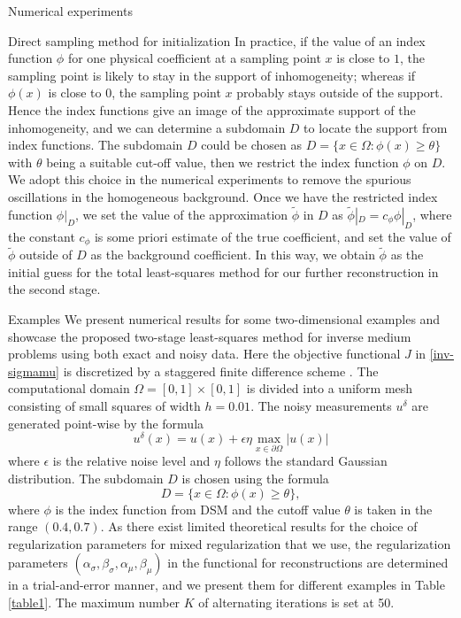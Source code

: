 \documentclass[11pt]{article}%
\renewcommand{\_}{{\fontfamily{ptm}\selectfont\textunderscore}}
\theoremstyle{plain}
\numberwithin{equation}{section}
\begin{document}
\begin{section}{Numerical experiments}
\begin{subsection}{Direct sampling method for initialization}
In practice, if the value of an index function $\phi$ for one physical coefficient at a sampling point $x$ is close to $1$,  
the sampling point is likely to stay in the support of inhomogeneity; whereas if $\phi(x)$ is close to $0$, the sampling point $x$ probably stays outside of the support. Hence the index functions  give an image of the approximate support of the inhomogeneity, and we can determine a subdomain $D$ to locate the support from index functions. The subdomain $D$  could be chosen as $D = \{x \in \Omega:  \phi(x) \geq \theta\}$ with $\theta$ being a suitable cut-off value, then we restrict the index function $\phi$ on $D$.  We adopt this choice in the numerical experiments to remove the spurious oscillations in the homogeneous background. Once we have the restricted index function $\phi|_D$, we set the value of the approximation $\tilde{\phi}$ in $D$ as $\tilde{\phi}|_D = c_\phi \phi|_D$, where the
constant $c_\phi$ is some priori estimate of the true coefficient, and set the value of $\tilde{\phi}$ outside of $D$ as the background coefficient.
In this way, we obtain $\tilde{\phi}$  as the initial guess for the total least-squares method for our further 
reconstruction in the second stage.
\end{subsection}



\begin{subsection}{Examples}
We present numerical results for some two-dimensional examples and
showcase the proposed two-stage least-squares method for inverse medium problems using both exact and noisy data. 
Here the objective functional $J$ in \eqref{inv-sigmamu} is discretized
by a staggered finite difference scheme \cite{virieux1984sh,robertsson1994viscoelastic}. 
The  computational domain $\Omega= [0,1]\times[0,1]$ is divided into a uniform mesh consisting of small squares of width $h=0.01$. The noisy measurements $u^\delta$ are generated point-wise by the formula
$$u^\delta(x) = u(x)+\epsilon \eta \max_{x\in\partial\Omega}|u(x)|$$
where $\epsilon$ is the relative noise level and $\eta$ follows the standard Gaussian distribution. The subdomain $D$ is chosen using the formula
\begin{equation}\label{setD}
D = \{x\in\Omega: \phi(x)\geq \theta\},
\end{equation}
where $\phi$ is the index function from DSM and the cutoff value $\theta$ is taken in the range $(0.4,0.7)$.   As there exist limited theoretical results for the choice of regularization parameters for mixed regularization that we use, the regularization parameters $(\alpha_\sigma,\beta_\sigma,\alpha_\mu,\beta_\mu)$ in the functional for reconstructions are determined in a trial-and-error manner, and we present them for different examples in Table \ref{table1}. The maximum number $K$ of alternating iterations is set at 50.


\end{subsection}
\end{section}
\end{document}
